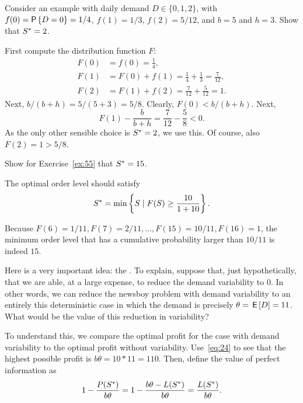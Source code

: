 \begin{exercise}
  Consider an example with daily demand $D\in \{0,1,2\}$, with 
 $f(0) = \P{D=0}=1/4$, $f(1)=1/3$, $f(2)=5/12$, and $b=5$ and $h=3$. Show that $S^*=2$.
\begin{solution}
First compute the distribution function $F$:
\begin{align*}
  F(0) &= f(0) = \frac 1 4,\\
  F(1) &= F(0) +f(1)= \frac 1 4 + \frac 1 3 = \frac{7}{12},\\
  F(2) &= F(1) + f(2) = \frac 7{12}  + \frac 5 {12}  = 1.
\end{align*}
Next, $b/(b+h)=5/(5+3)=5/8$. Clearly, $F(0) < b/(b+h)$. Next, 
\begin{equation*}
  F(1) - \frac b{b+h} = \frac 7 {12} - \frac 5 8 < 0.
\end{equation*}
As the only other sensible choice is $S^*=2$, we use this. Of course, also $F(2)=1>5/8$. 
\end{solution}
\end{exercise}

\begin{exercise} Show for  Exercise~\ref{ex:55} that $S^*=15$.

\begin{solution}
 The optimal order level should satisfy 
\begin{align*}
S^* = \min\left\{S\mid F(S)\geq \frac{10}{1+10}\right\}.
\end{align*}

Because $F(6)=1/11, F(7)=2/11, \ldots, F(15)=10/11, F(16)=1$, the minimum order level that has a cumulative probability larger than $10/11$ is indeed $15$. 
\end{solution}
\end{exercise}

Here is a very important idea: the . To explain,  suppose that, just hypothetically, that  we are able, at a large expense, to reduce the demand variability to 0. In other words, we can reduce the newsboy problem with demand variability to an entirely this deterministic case in which the demand is precisely $\theta = \,\mathsf{E}\left[D\right] = 11$. What would be the value of this reduction in variability? 

To understand this, we compare the optimal profit for the case with demand variability to the optimal profit without variability.  Use~\eqref{eq:24} to see that the highest possible profit is $b \theta = 10*11 = 110$. Then, define the value of perfect information as
\begin{equation*}
1-  \frac{P(S^*)}{b \theta} = 
1-  \frac{b \theta - L(S^*)}{b \theta} = 
 \frac{L(S^*)}{b \theta}.
\end{equation*}


